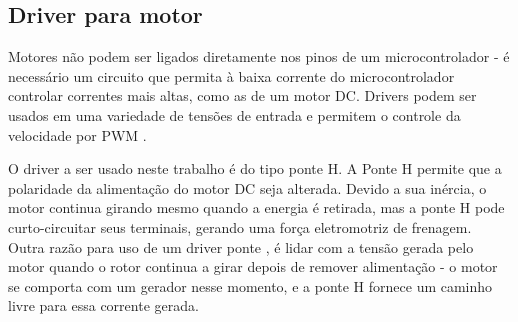 \subsection{Driver para motor}

	Motores não podem ser ligados diretamente nos pinos de um microcontrolador -
	é necessário um circuito que permita à baixa corrente do microcontrolador
	controlar correntes mais altas, como as de um motor DC. Drivers podem ser
	usados em uma variedade de tensões de entrada e permitem o controle da
	velocidade por PWM \cite{toshiba_ponte_h}.

	O driver a ser usado neste trabalho é do tipo ponte H. A Ponte H permite que
	a polaridade da alimentação do motor DC seja alterada. Devido a sua inércia,
	o motor continua girando mesmo quando a energia é retirada, mas a ponte H
	pode curto-circuitar seus terminais, gerando uma força eletromotriz de
	frenagem. Outra razão para uso de um driver ponte , é lidar com a tensão
	gerada pelo motor quando o rotor continua a girar depois de remover
	alimentação - o motor se comporta com um gerador nesse momento, e a ponte H
	fornece um caminho livre para essa corrente gerada.


